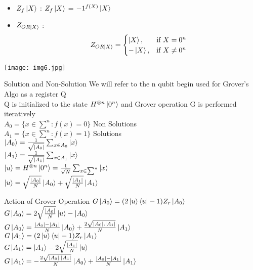 \documentclass[12pt]{beamer}
\begin{document}
\begin{frame}
\begin{itemize}
\item{$Z_f\ket{X}$  : } $Z_f\ket{X}$ = $-1^{f(X)}\ket{X}$
\item{$Z_{OR\ket{X}}$  : } \[
    \ Z_{OR\ket{X}} =
    \begin{cases}
        \ket{X}, & \text{if }  X = 0^n\\
        - \ket{X}, & \text{if } X \neq 0^n
    \end{cases}
\] 

\end{itemize}
\texttt{[image: img6.jpg]} 
\end{frame}
\begin{frame}{Solution and Non-Solution}
We will refer to the n qubit begin used for Grover's Algo as a register Q\\
{Q is initialized to the state $H^{\otimes n}\ket{0^n}$ and Grover operation G is performed iteratively}\\
$A_0 = \{x \in \sum^n : f(x) = 0\}$ \hspace{1cm} Non Solutions\\
$A_1 = \{x \in \sum^n : f(x) = 1\}$ \hspace{1cm} Solutions\\
\vspace{0.5cm}
$\ket{A_0} = \frac{1}{\sqrt{|A_0|}}\sum_{x \in A_0}\ket{x}$\\
$\ket{A_1} = \frac{1}{\sqrt{|A_1|}}\sum_{x \in A_1}\ket{x}$\\
\vspace{0.5cm}
$\ket{u} = H^{\otimes n}\ket{0^n} = \frac{1}{\sqrt{N}}\sum_{x\in \sum^{n}}\ket{x}$\\
$\ket{u} = \sqrt{\frac{|A_0|}{N}}\ket{A_0} + \sqrt{\frac{|A_1|}{N}}\ket{A_1}$
\end{frame}
\begin{frame}{Action of Grover Operation}
$G\ket{A_0} = (2 \ket{u} \bra{u}-1) Z_r \ket{A_0}$\\

$G\ket{A_0}= 2\sqrt{\frac{|A_0|}{N}} \ket{u} - \ket{A_0}$\\

$G\ket{A_0} = \frac{|A_0|-|A_1|}{N} \ket{A_0} + \frac{2 \sqrt{|A_0|.|A_1|}}{N} \ket{A_1} $\\
\vspace{1cm}
$G\ket{A_1} = (2 \ket{u} \bra{u}-1) Z_r \ket{A_1}$\\

$G\ket{A_1}= \ket{A_1} - 2\sqrt{\frac{|A_1|}{N}} \ket{u} $\\
$G\ket{A_1} = - \frac{2 \sqrt{|A_0|.|A_1|}}{N} \ket{A_0} + \frac{|A_0|-|A_1|}{N} \ket{A_1}  $\\
\end{frame}
\end{document}
